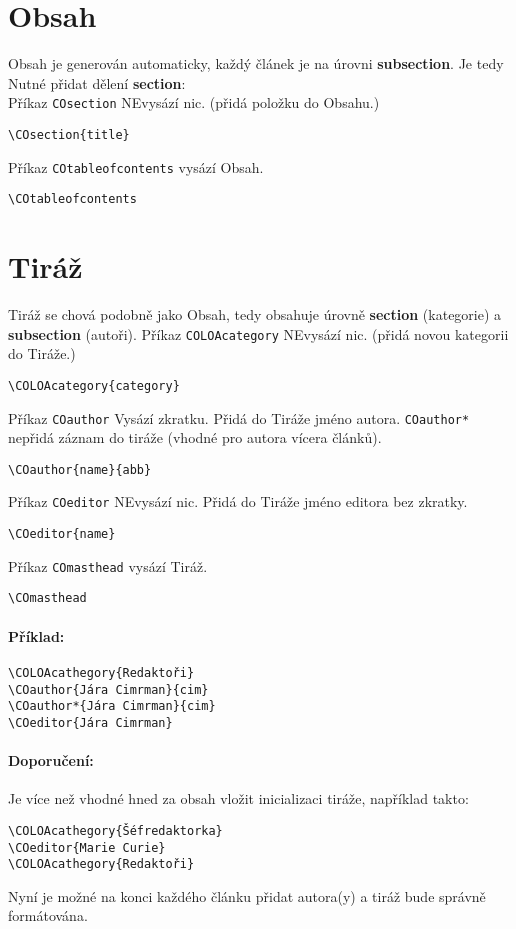 \documentclass[a4paper]{article}
\begin{document}
\section{Obsah}%
Obsah je generován automaticky, každý článek je na úrovni \textbf{subsection}. Je tedy Nutné přidat dělení \textbf{section}:\\[0.3cm]
Příkaz \texttt{COsection} NEvysází nic. (přidá položku do Obsahu.)
\begin{verbatim}
\COsection{title}
\end{verbatim}
Příkaz \texttt{COtableofcontents} vysází Obsah.
\begin{verbatim}
\COtableofcontents
\end{verbatim}
%
\section{Tiráž}%
Tiráž se chová podobně jako Obsah, tedy obsahuje úrovně \textbf{section} (kategorie) a \textbf{subsection} (autoři).
Příkaz \texttt{COLOAcategory} NEvysází nic. (přidá novou kategorii do Tiráže.)
\begin{verbatim}
\COLOAcategory{category}
\end{verbatim}
Příkaz \texttt{COauthor} Vysází zkratku. Přidá do Tiráže jméno autora. \texttt{COauthor*} nepřidá záznam do tiráže (vhodné pro autora vícera článků).
\begin{verbatim}
\COauthor{name}{abb}
\end{verbatim}
Příkaz \texttt{COeditor} NEvysází nic. Přidá do Tiráže jméno editora bez zkratky.
\begin{verbatim}
\COeditor{name}
\end{verbatim}
Příkaz \texttt{COmasthead} vysází Tiráž.
\begin{verbatim}
\COmasthead
\end{verbatim}

\paragraph{Příklad:}
\begin{verbatim}
\COLOAcathegory{Redaktoři}
\COauthor{Jára Cimrman}{cim}
\COauthor*{Jára Cimrman}{cim}
\COeditor{Jára Cimrman}
\end{verbatim}
\paragraph{Doporučení:}
Je více než vhodné hned za obsah vložit inicializaci tiráže, například takto:
\begin{verbatim}
\COLOAcathegory{Šéfredaktorka}
\COeditor{Marie Curie}
\COLOAcathegory{Redaktoři}
\end{verbatim}
Nyní je možné na konci každého článku přidat autora(y) a tiráž bude správně formátována.
%
\end{document}
